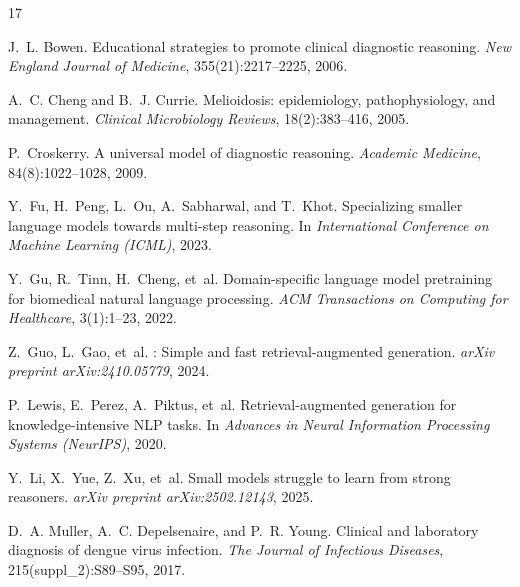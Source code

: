 \documentclass{article}
\begin{document}
\begin{thebibliography}{17}
\providecommand{\natexlab}[1]{#1}

J.~L. Bowen.
\newblock Educational strategies to promote clinical diagnostic reasoning.
\newblock \emph{New England Journal of Medicine}, 355(21):2217--2225, 2006.

A.~C. Cheng and B.~J. Currie.
\newblock Melioidosis: epidemiology, pathophysiology, and management.
\newblock \emph{Clinical Microbiology Reviews}, 18(2):383--416, 2005.

P.~Croskerry.
\newblock A universal model of diagnostic reasoning.
\newblock \emph{Academic Medicine}, 84(8):1022--1028, 2009.

Y.~Fu, H.~Peng, L.~Ou, A.~Sabharwal, and T.~Khot.
\newblock Specializing smaller language models towards multi-step reasoning.
\newblock In \emph{International Conference on Machine Learning (ICML)}, 2023.

Y.~Gu, R.~Tinn, H.~Cheng, et~al.
\newblock Domain-specific language model pretraining for biomedical natural language processing.
\newblock \emph{ACM Transactions on Computing for Healthcare}, 3(1):1--23, 2022.

Z.~Guo, L.~Gao, et~al.
: Simple and fast retrieval-augmented generation.
\newblock \emph{arXiv preprint arXiv:2410.05779}, 2024.

P.~Lewis, E.~Perez, A.~Piktus, et~al.
\newblock Retrieval-augmented generation for knowledge-intensive {NLP} tasks.
\newblock In \emph{Advances in Neural Information Processing Systems (NeurIPS)}, 2020.

Y.~Li, X.~Yue, Z.~Xu, et~al.
\newblock Small models struggle to learn from strong reasoners.
\newblock \emph{arXiv preprint arXiv:2502.12143}, 2025.

D.~A. Muller, A.~C. Depelsenaire, and P.~R. Young.
\newblock Clinical and laboratory diagnosis of dengue virus infection.
\newblock \emph{The Journal of Infectious Diseases}, 215(suppl\_2):S89--S95, 2017.


\end{thebibliography}
\end{document}
